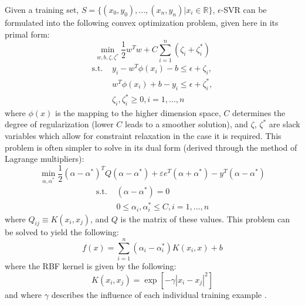 \documentclass[12]{article}
\begin{document}
\noindent Given a training set, $S = \{(x_0,y_0), ..., (x_n,y_n) | x_i \in \mathbb{R}\}$,
$\epsilon$-SVR can be formulated into the following convex optimization problem,
given here in its primal form:
\begin{equation*}
\min_{w, b, \zeta, \zeta^*} \frac{1}{2} w^T w + C \sum_{i=1}^{n} (\zeta_i +
\zeta_i^*)
\end{equation*}
\begin{align*}
\mbox{s.t. } & y_i - w^T \phi (x_i) - b \leq \epsilon + \zeta_i, \\
& w^T \phi (x_i) + b - y_i \leq \epsilon + \zeta_i^*, \\
& \zeta_i, \zeta_i^* \geq 0, i=1,...,n
\end{align*}
where $\phi(x)$ is the mapping to the higher dimension space, $C$ determines the
degree of regularization (lower $C$ leads to a smoother solution), and $\zeta$, 
$\zeta^*$ are slack variables which
allow for constraint relaxation in the case it is required. This problem is
often simpler to solve in its dual form (derived through the method of Lagrange
multipliers):
\begin{equation*}
\min_{\alpha, \alpha^*} \frac{1}{2} (\alpha - \alpha^*)^T Q (\alpha - \alpha^*)
+ \varepsilon e^T (\alpha + \alpha^*) - y^T (\alpha - \alpha^*)
\end{equation*}
\begin{align*}
\mbox{s.t. } & (\alpha - \alpha^*) = 0 \\
& 0 \leq \alpha_i, \alpha_i^* \leq C, i=1, ..., n
\end{align*}
where $Q_{ij} \equiv K(x_i, x_j)$, and $Q$ is the matrix of these values.  This
problem can be solved to yield the following:
\begin{equation}
f(x) = \sum_{i=1}^n (\alpha_i - \alpha_i^*) K(x_i, x) + b
\end{equation}
where the RBF kernel is given by the following:
\begin{equation}
K(x_i,x_j) = \exp{\left[-\gamma |x_i - x_j|^2\right]}
\end{equation}
and where $\gamma$ describes the influence of each individual training example
\cite{scikit_learn_svr}.

\end{document}
